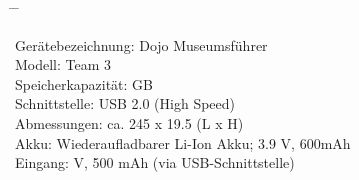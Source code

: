 \begin{tabbing}

\hspace{40mm}		\= \hspace{15mm} \=\kill

Gerätebezeichnung:	\> Dojo Museumsführer \\[5mm]
Modell:				\> Team 3 \\[5mm]
Speicherkapazität:	 GB \\[5mm]
Schnittstelle:		\> USB 2.0 (High Speed) \\[5mm]
Abmessungen:		\> ca. 245 x 19.5 (L x H) \\[5mm]
Akku:				\> Wiederaufladbarer Li-Ion Akku; 3.9 V, 600mAh \\[5mm]
Eingang:			 V, 500 mAh (via USB-Schnittstelle) \\[5mm]

\end{tabbing}